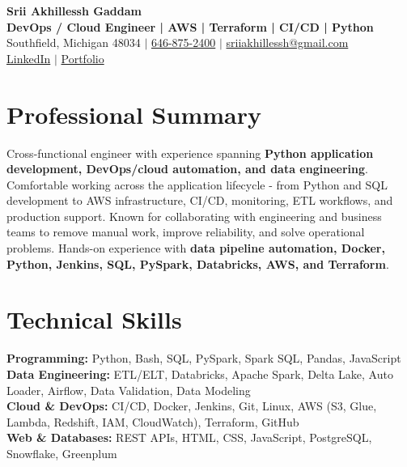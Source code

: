 \documentclass[letterpaper,10pt]{article}
\begin{document}
\fontsize{9.35pt}{10.45pt}\selectfont

\begin{center}
    {\LARGE \textbf{Srii Akhillessh Gaddam}} \\[-1pt]
    \textbf{DevOps / Cloud Engineer | AWS | Terraform | CI/CD | Python} \\[2pt]
    Southfield, Michigan 48034 $|$
    \href{tel:6468752400}{646-875-2400} $|$
    \href{mailto:sriiakhillessh@gmail.com}{sriiakhillessh@gmail.com} \\[1pt]
    \href{https://www.linkedin.com/in/srii-akhiilessh-gaddam-b48668191/}{LinkedIn} $|$
    \href{https://sriiakhillesshg.github.io/portfolio/}{Portfolio}
\end{center}
\vspace{-8pt}

\section{Professional Summary}
\small{Cross-functional engineer with experience spanning \textbf{Python application development, DevOps/cloud automation, and data engineering}. Comfortable working across the application lifecycle - from Python and SQL development to AWS infrastructure, CI/CD, monitoring, ETL workflows, and production support. Known for collaborating with engineering and business teams to remove manual work, improve reliability, and solve operational problems. Hands-on experience with \textbf{data pipeline automation, Docker, Python, Jenkins, SQL, PySpark, Databricks, AWS, and Terraform}.}

\section{Technical Skills}
\small{
\textbf{Programming:} Python, Bash, SQL, PySpark, Spark SQL, Pandas, JavaScript \\
\textbf{Data Engineering:} ETL/ELT, Databricks, Apache Spark, Delta Lake, Auto Loader, Airflow, Data Validation, Data Modeling \\
\textbf{Cloud \& DevOps:} CI/CD, Docker, Jenkins, Git, Linux, AWS (S3, Glue, Lambda, Redshift, IAM, CloudWatch), Terraform, GitHub \\
\textbf{Web \& Databases:} REST APIs, HTML, CSS, JavaScript, PostgreSQL, Snowflake, Greenplum
}
\end{document}
